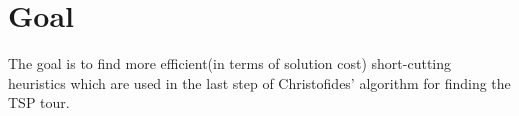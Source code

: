 \chapter{Goal}

The goal is to find more efficient(in terms of solution cost) short-cutting heuristics which are used in the last step of Christofides' algorithm for finding the TSP tour.

